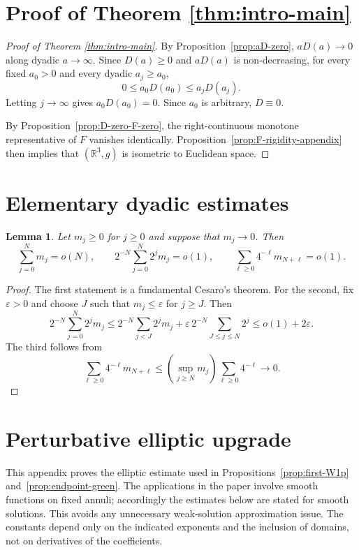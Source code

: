 \documentclass[11pt]{amsart}
\numberwithin{equation}{section}
\newtheorem{lemma}[theorem]{Lemma}
\theoremstyle{definition}
\newcommand{\R}{\mathbb R}
\newcommand{\eps}{\varepsilon}
\begin{document}
\section{Proof of Theorem \ref{thm:intro-main}}
\label{sec:conclusion}

\begin{proof}[Proof of Theorem \ref{thm:intro-main}]
By Proposition~\ref{prop:aD-zero}, $aD(a)\to0$ along dyadic $a\to\infty$.  Since $D(a)\ge0$ and $aD(a)$ is non-decreasing, for every fixed $a_0>0$ and every dyadic $a_j\ge a_0$,
$$
        0\le a_0D(a_0)\le a_jD(a_j).
$$
Letting $j\to\infty$ gives $a_0D(a_0)=0$.  Since $a_0$ is arbitrary, $D\equiv0$.

By Proposition~\ref{prop:D-zero-F-zero}, the right-continuous monotone representative of $F$ vanishes identically.  Proposition~\ref{prop:F-rigidity-appendix} then implies that $(\R^3,g)$ is isometric to Euclidean space.
\end{proof}



\appendix

\section{Elementary dyadic estimates}
\label{app:cesaro}

\begin{lemma}\label{lem:cesaro}
Let $m_j\ge0$ for $j\ge0$ and suppose that $m_j\to0$.  Then
$$
        \sum_{j=0}^N m_j=o(N),
        \qquad
        2^{-N}\sum_{j=0}^N2^jm_j=o(1),
        \qquad
        \sum_{\ell\ge0}4^{-\ell}m_{N+\ell}=o(1).
$$
\end{lemma}

\begin{proof}
The first statement is a fundamental Cesaro's theorem.  For the second, fix $\eps>0$ and choose $J$ such that $m_j\le\eps$ for $j\ge J$.  Then
$$
        2^{-N}\sum_{j=0}^N2^jm_j
        \le 2^{-N}\sum_{j<J}2^jm_j
        +\eps\,2^{-N}\sum_{J\le j\le N}2^j
        \le o(1)+2\eps.
$$
The third follows from
$$
        \sum_{\ell\ge0}4^{-\ell}m_{N+\ell}
        \le \left(\sup_{j\ge N}m_j\right)\sum_{\ell\ge0}4^{-\ell}\to0.
$$
\end{proof}


\section{Perturbative elliptic upgrade}
\label{app:elliptic}

This appendix proves the elliptic estimate used in Propositions~\ref{prop:first-W1p} and~\ref{prop:endpoint-green}.  The applications in the paper involve smooth functions on fixed annuli; accordingly the estimates below are stated for smooth solutions.  This avoids any unnecessary weak-solution approximation issue.  The constants depend only on the indicated exponents and the inclusion of domains, not on derivatives of the coefficients.
\end{document}
